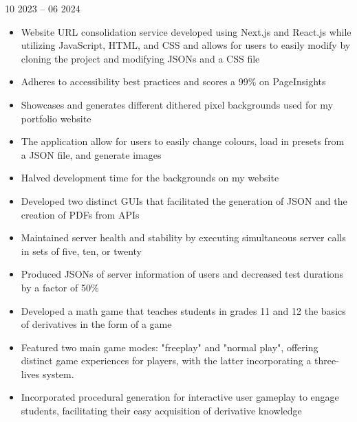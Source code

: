 \documentclass[10pt,a4paper,ragged2e,withhyper,darkmode]{altacv}
\begin{document}
\begin{paracol}{1}
            {10 2023 -- 06 2024}{}
            \begin{itemize}
                \item{Website URL consolidation service developed using Next.js and React.js while utilizing JavaScript, HTML, and CSS and allows for users to easily modify by cloning the project and modifying JSONs and a CSS file}
                \item{Adheres to accessibility best practices and scores a 99\% on PageInsights}
            \end{itemize}
            \divider
            \begin{itemize}
                \item{Showcases and generates different dithered pixel backgrounds used for my portfolio website} 
                \item{The application allow for users to easily change colours, load in presets from a JSON file, and generate images} 
                \item{Halved development time for the backgrounds on my website} 
            \end{itemize}
            \divider
            \begin{itemize}
                \item{Developed two distinct GUIs that facilitated the generation of JSON and the creation of PDFs from APIs} 
                 \item{Maintained server health and stability by executing simultaneous server calls in sets of five, ten, or twenty} 
                \item{Produced JSONs of server information of users and decreased test durations by a factor of 50\%} 
            \end{itemize}
            \divider
            \begin{itemize}
                \item{Developed a math game that teaches students in grades 11 and 12 the basics of derivatives in the form of a game}
                \item{Featured two main game modes: "freeplay" and "normal play", offering distinct game experiences for players, with the latter incorporating a three-lives system.}
                \item{Incorporated procedural generation for interactive user gameplay to engage students, facilitating their easy acquisition of derivative knowledge}
            \end{itemize}


\end{paracol}
\end{document}
